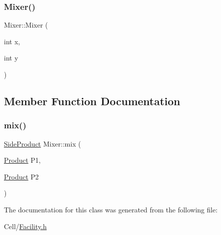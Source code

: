 \subsubsection{\texorpdfstring{Mixer()}{Mixer()}}
{\footnotesize\ttfamily Mixer\+::\+Mixer (\begin{DoxyParamCaption}\item[{int}]{x,  }\item[{int}]{y }\end{DoxyParamCaption})}



\subsection{Member Function Documentation}
\mbox{\label{classMixer_a9352a81375709063c7473e3951f51214}} 
\subsubsection{\texorpdfstring{mix()}{mix()}}
{\footnotesize\ttfamily \mbox{\hyperlink{classSideProduct}{Side\+Product}} Mixer\+::mix (\begin{DoxyParamCaption}\item[{\mbox{\hyperlink{classProduct}{Product}}}]{P1,  }\item[{\mbox{\hyperlink{classProduct}{Product}}}]{P2 }\end{DoxyParamCaption})}



The documentation for this class was generated from the following file\+:\begin{DoxyCompactItemize}
\item 
Cell/\mbox{\hyperlink{Facility_8h}{Facility.\+h}}\end{DoxyCompactItemize}
